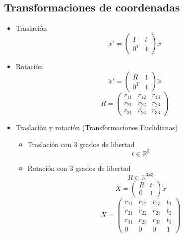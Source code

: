 \documentclass[main.tex]{subfiles}
\begin{document}
\subsection{Transformaciones de coordenadas}
\begin{itemize}
\item Traslación
  \begin{equation}
    {\tilde{x}}'= \begin{pmatrix}
                    I & t \\
                    0^{T} & 1 \end{pmatrix} \tilde{x}
  \end{equation}
  
\item Rotación
  \begin{equation}
    {\tilde{x}}' = \begin{pmatrix}
                     R &1 \\
                     0^{T} &1
                   \end{pmatrix}\tilde{x}  
  \end{equation}
  \begin{equation}
    R = \begin{pmatrix}
          r_{11} & r_{12}  &r_{13} \\ 
          r_{21} & r_{22}  &r_{23} \\ 
          r_{31} & r_{23}  &r_{33}
        \end{pmatrix}
  \end{equation}

\item Traslación y rotación (Transformaciones Euclidianas)
  \begin{itemize}
  \item Traslación con 3 grados de libertad
    \begin{equation}
      t \in \mathbb{R}^{3}
    \end{equation}
  \item Rotación con 3 grados de libertad
    \begin{equation}
      R \in \mathbb{R}^{3x3}
    \end{equation}
    \begin{equation}
      X = \begin{pmatrix}
            R & t \\
            0 & 1 \end{pmatrix} \tilde{x}
    \end{equation}
    \begin{equation}
      X = \begin{pmatrix}
            r_{11} & r_{12}  & r_{13} & t_{1}\\ 
            r_{21} & r_{22}  & r_{23} & t_{2}\\ 
            r_{31} & r_{23}  & r_{33} & t_{3}\\
            0      & 0       & 0      & 1
          \end{pmatrix}
    \end{equation}
  \end{itemize}
\end{itemize}
\end{document}
